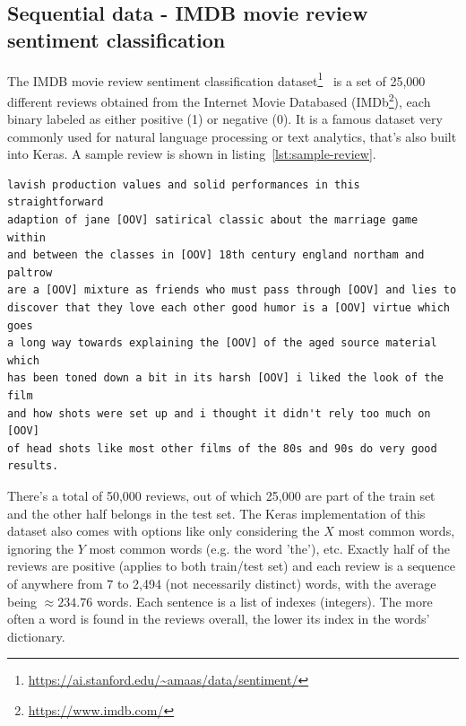 \subsection{Sequential data - IMDB movie review sentiment classification}
\label{dataset-sequential}
The IMDB movie review sentiment classification
dataset\footnote{\url{https://ai.stanford.edu/~amaas/data/sentiment/}}~\cite{maas-EtAl:2011:ACL-HLT2011}
is a set of 25,000 different reviews obtained from the
Internet Movie Databased (IMDb\footnote{\url{https://www.imdb.com/}}), each binary labeled as either
positive (1) or negative (0). It is a famous dataset very commonly used for natural language
processing or text analytics, that's also built into Keras. A sample review is shown in
listing~\ref{lst:sample-review}.

\begin{lstlisting}[caption={A sample positive review from the IMDB movie review sentiment classification
dataset converted into words
(OOV is an out-of-vocabulary token representing an unknown word).}, label={lst:sample-review}]
lavish production values and solid performances in this straightforward
adaption of jane [OOV] satirical classic about the marriage game within
and between the classes in [OOV] 18th century england northam and paltrow
are a [OOV] mixture as friends who must pass through [OOV] and lies to
discover that they love each other good humor is a [OOV] virtue which goes
a long way towards explaining the [OOV] of the aged source material which
has been toned down a bit in its harsh [OOV] i liked the look of the film
and how shots were set up and i thought it didn't rely too much on [OOV]
of head shots like most other films of the 80s and 90s do very good results.
\end{lstlisting}

There's a total of 50,000 reviews, out of which 25,000 are part of the train set and the other half belongs in the
test set. The Keras implementation of this dataset also comes with options like only considering the $X$ most common
words, ignoring the $Y$ most common words (e.g. the word 'the'), etc.
Exactly half of the reviews are positive (applies to both train/test set) and each review is a sequence of anywhere
from 7 to 2,494 (not necessarily distinct) words, with the average being $\approx 234.76$ words.
Each sentence is a list of indexes (integers). The more often a word is found in the reviews overall,
the lower its index in the words' dictionary.




